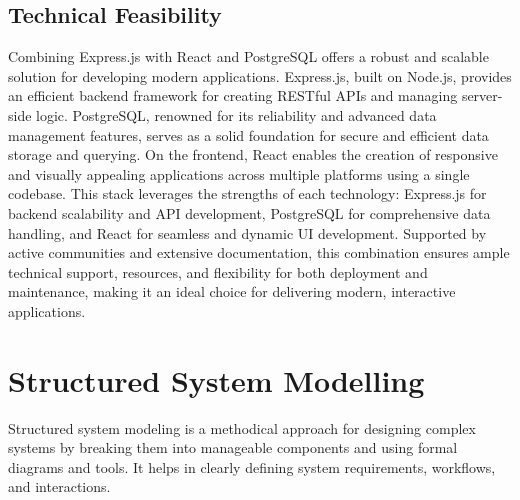 \subsection{Technical Feasibility}
Combining Express.js with React and PostgreSQL offers a robust and scalable solution for developing modern applications. Express.js, built on Node.js, provides an efficient backend framework for creating RESTful APIs and managing server-side logic. PostgreSQL, renowned for its reliability and advanced data management features, serves as a solid foundation for secure and efficient data storage and querying. On the frontend, React enables the creation of responsive and visually appealing applications across multiple platforms using a single codebase. This stack leverages the strengths of each technology: Express.js for backend scalability and API development, PostgreSQL for comprehensive data handling, and React for seamless and dynamic UI development. Supported by active communities and extensive documentation, this combination ensures ample technical support, resources, and flexibility for both deployment and maintenance, making it an ideal choice for delivering modern, interactive applications.
\section{Structured System Modelling }
Structured system modeling is a methodical approach for designing complex systems by breaking them into manageable components and using formal diagrams and tools. It helps in clearly defining system requirements, workflows, and interactions.
\newpage
